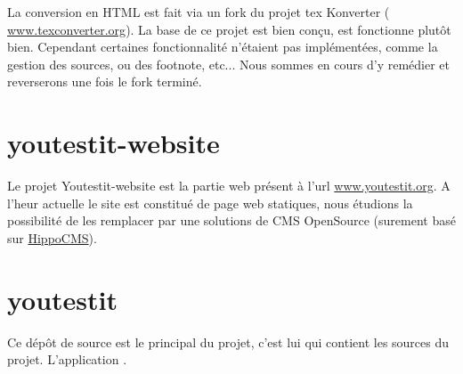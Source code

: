 La conversion en HTML est fait via un fork du projet tex Konverter (
		\href{http://www.texconverter.org}{www.texconverter.org}). La base de ce projet est bien
conçu, est fonctionne plutôt bien. Cependant certaines fonctionnalité n'étaient pas implémentées,
comme la gestion des sources, ou des footnote, etc... Nous sommes en cours d'y remédier et
reverserons une fois le fork terminé. 

\section{youtestit-website}	
Le projet Youtestit-website est la partie web présent à l'url \href{http://www.youtestit.org}{www.youtestit.org}.
A l'heur actuelle le site est constitué de page web statiques, nous étudions la possibilité de les
remplacer par une solutions de CMS OpenSource (surement basé sur \href{http://www.onehippo.com/en/products/cms}{HippoCMS}). 



\section{youtestit}
Ce dépôt de source est le principal du projet, c'est lui qui contient les sources du projet.
L'application \youTestIt{}. 
